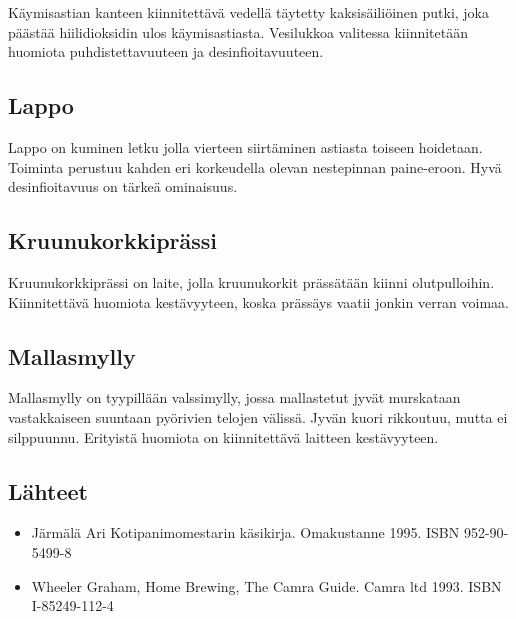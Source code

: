 \documentclass[a4paper,11pt]{report}
\begin{document}
Käymisastian kanteen kiinnitettävä vedellä täytetty kaksisäiliöinen putki, joka päästää hiilidioksidin ulos käymisastiasta. Vesilukkoa valitessa kiinnitetään huomiota puhdistettavuuteen ja desinfioitavuuteen.

\subsection*{Lappo}

Lappo on kuminen letku jolla vierteen siirtäminen astiasta toiseen hoidetaan. Toiminta perustuu kahden eri korkeudella olevan nestepinnan paine-eroon. Hyvä desinfioitavuus on tärkeä ominaisuus.

\subsection*{Kruunukorkkiprässi}

Kruunukorkkiprässi on laite, jolla kruunukorkit prässätään kiinni olutpulloihin. Kiinnitettävä huomiota kestävyyteen, koska prässäys vaatii jonkin verran voimaa.

\subsection*{Mallasmylly}

Mallasmylly on tyypillään valssimylly, jossa mallastetut jyvät murskataan vastakkaiseen suuntaan pyörivien telojen välissä. Jyvän kuori rikkoutuu, mutta ei silppuunnu. Erityistä huomiota on kiinnitettävä laitteen kestävyyteen.

\subsection*{Lähteet}
\begin{itemize}
\item Järmälä Ari Kotipanimomestarin käsikirja. Omakustanne 1995. ISBN 952-90-5499-8
\item Wheeler Graham, Home Brewing, The Camra Guide. Camra ltd 1993. ISBN I-85249-112-4
\end{itemize}
\end{document}
